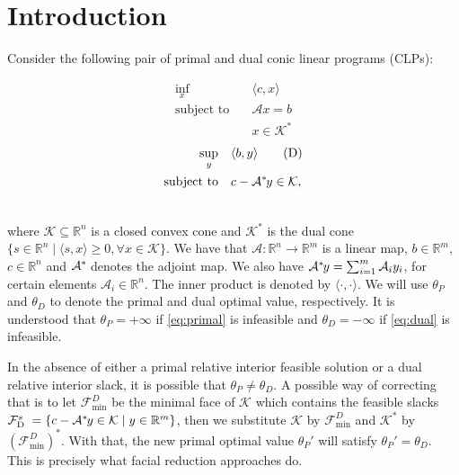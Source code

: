 \documentclass{article}
\newcommand{\inProd}[2]{\langle #1 , #2 \rangle }
\newcommand{\feasS}{\mathcal{F}_{\text{D }}^s}
\newcommand{\minFaceD}{ {\mathcal{F}_{\min}^D}}
\newcommand{\stdMap}{ {\mathcal{A}}}
\newcommand{\stdCone}{ {\mathcal{K}}}
\newcommand{\pOpt}{ {\theta _P}}
\newcommand{\dOpt}{ {\theta _D}}
\renewcommand{\Re}{\mathbb{R}}
\newcommand{\T}{\ast\hspace{-1pt}}
\begin{document}
\section{Introduction}
Consider the following pair of primal and dual conic linear programs (CLPs):
\vspace*{-3\baselineskip} 
\begin{multicols}{2}
\begin{align}
\underset{x}{\inf} & \quad \inProd{c}{x} \label{eq:primal}\tag{P}\\ 
\mbox{subject to} & \quad \stdMap x = b \nonumber \\ 
&\quad x \in \stdCone ^* \nonumber 
\end{align}
	\break
	\begin{align}
	\underset{y}{\sup} & \quad \inProd{b}{y} \label{eq:dual} \tag{D} \\ 
	\mbox{subject to} & \quad c - \stdMap ^\T y \in \stdCone \nonumber,\\ \nonumber
	\end{align}	
\end{multicols}
\noindent where $\stdCone \subseteq \Re^n$ is a closed convex cone and $\stdCone^*$ is the dual cone $\{s \in \Re^n \mid \inProd{s}{x} \geq 0, \forall x \in \stdCone \}$. We have 
that $\stdMap: \Re^n \to \Re^m$ is a linear map, $b \in \Re^m$, $c \in \Re^n$ and 
$\stdMap^\T$ denotes the adjoint map. We also have $\stdMap^\T y = \sum _{i=1}^m \stdMap _i y_i$, for certain 
elements $\stdMap _i \in \Re^n$. The  inner product is denoted by $\inProd{\cdot}{\cdot}$.
We will use $\pOpt$ and $\dOpt$ to denote the primal and  dual optimal value, respectively.
It is understood that $\pOpt = +\infty$ if \eqref{eq:primal} is infeasible and 
$\dOpt = -\infty$ if \eqref{eq:dual} is infeasible.



In the absence of either a primal relative interior feasible solution or a dual 
relative interior slack, it is possible that $\pOpt \neq \dOpt$. A possible 
way of  correcting that is to let $\minFaceD$ be 
the minimal face of $\stdCone$ which contains the feasible slacks $\feasS = \{c- \stdMap ^\T y \in \stdCone \mid y \in \Re^m  \}$, then 
we substitute $\stdCone$ by $\minFaceD$ and $\stdCone^*$ by $(\minFaceD)^*$. With that, 
the new primal optimal value $\pOpt ' $ will satisfy $\pOpt ' = \dOpt$. This is precisely what 
facial reduction \cite{Borwein1981495, pataki_strong_2013, article_waki_muramatsu} approaches do.
\end{document}
